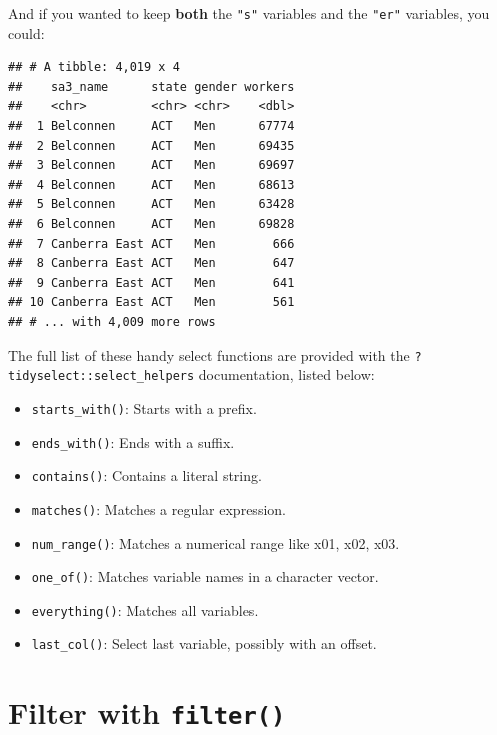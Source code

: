 \documentclass[]{book}
\newenvironment{Shaded}{\begin{snugshade}}{\end{snugshade}}
\newcommand{\KeywordTok}[1]{\textcolor[rgb]{0.13,0.29,0.53}{\textbf{#1}}}
\newcommand{\NormalTok}[1]{#1}
\newcommand{\OperatorTok}[1]{\textcolor[rgb]{0.81,0.36,0.00}{\textbf{#1}}}
\newcommand{\StringTok}[1]{\textcolor[rgb]{0.31,0.60,0.02}{#1}}
\providecommand{\tightlist}{%
  \setlength{\itemsep}{0pt}\setlength{\parskip}{0pt}}
\begin{document}
And if you wanted to keep \textbf{both} the \texttt{"s"} variables and the \texttt{"er"} variables, you could:

\begin{Shaded}
\end{Shaded}

\begin{verbatim}
## # A tibble: 4,019 x 4
##    sa3_name      state gender workers
##    <chr>         <chr> <chr>    <dbl>
##  1 Belconnen     ACT   Men      67774
##  2 Belconnen     ACT   Men      69435
##  3 Belconnen     ACT   Men      69697
##  4 Belconnen     ACT   Men      68613
##  5 Belconnen     ACT   Men      63428
##  6 Belconnen     ACT   Men      69828
##  7 Canberra East ACT   Men        666
##  8 Canberra East ACT   Men        647
##  9 Canberra East ACT   Men        641
## 10 Canberra East ACT   Men        561
## # ... with 4,009 more rows
\end{verbatim}

The full list of these handy select functions are provided with the \texttt{?tidyselect::select\_helpers} documentation, listed below:

\begin{itemize}
\tightlist
\item
  \texttt{starts\_with()}: Starts with a prefix.
\item
  \texttt{ends\_with()}: Ends with a suffix.
\item
  \texttt{contains()}: Contains a literal string.
\item
  \texttt{matches()}: Matches a regular expression.
\item
  \texttt{num\_range()}: Matches a numerical range like x01, x02, x03.
\item
  \texttt{one\_of()}: Matches variable names in a character vector.
\item
  \texttt{everything()}: Matches all variables.
\item
  \texttt{last\_col()}: Select last variable, possibly with an offset.
\end{itemize}

\hypertarget{filter-with-filter}{%
\section{\texorpdfstring{Filter with \texttt{filter()}}{Filter with filter()}}\label{filter-with-filter}}
\end{document}
